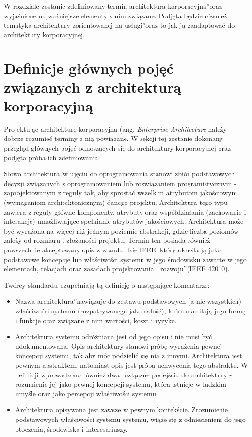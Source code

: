 W rozdziale zostanie zdefiniowany termin \quotedblbase architektura korporacyjna\textquotedblright oraz wyjaśnione najważniejsze elementy z nim związane. Podjęta będzie również tematyka \quotedblbase architektury zorientowanej na usługi\textquotedblright oraz to jak ją zaadaptować do architektury korporacyjnej. 

\section{Definicje głównych pojęć związanych z architekturą korporacyjną}
Projektując architekturę korporacyjną (ang. \textit{Enterprise Architecture} należy dobrze rozumieć terminy z nią powiązane. W sekcji tej zostanie dokonany przegląd głównych pojęć odnoszących się do architektury korporacyjnej oraz podjęta próba ich zdefiniowania.

Słowo \quotedblbase architektura\textquotedblright w ujęciu do oprogramowania stanowi zbiór podstawowych decyzji związanych z oprogramowaniem lub rozwiązaniem programistycznym - zaprojektowanym z reguły tak, aby sprostać wszelkim atrybutom jakościowym (wymaganiom architektonicznym) danego projektu. Architektura tego typu zawiera z reguły główne komponenty, atrybuty oraz współdziałania (zachowanie i interakcje) umożliwiające spełnianie atrybutów jakościowych. Architektura może być wyrażona na więcej niż jednym poziomie abstrakcji, gdzie liczba poziomów zależy od rozmiaru i złożoności projektu. Termin ten posiada również powszechnie akceptowany opis w standardzie IEEE, który określa ją jako \quotedblbase podstawowe koncepcje lub właściwości systemu w jego  środowisku zawarte w jego elementach, relacjach oraz zasadach projektowania i rozwoju\textquotedblright (IEEE 42010). \cite{SOAWzorceArch}

Twórcy standardu uzupełniają tą definicję o następujące komentarze: 
\begin{itemize}
\item{Nazwa \quotedblbase architektura\textquotedblright nawiązuje do zestawu podstawowych (a nie wszystkich) właściwości systemu (rozpatrywanego jako całość), które określają jego formę i funkcje oraz związane z nim wartości, koszt i ryzyko.}
\item{Architektura systemu odróżniana jest od jego opisu i nie musi być udokumentowana. Opis architektury stanowi próbę wyrażenia pewnej koncepcji systemu, tak aby móc podzielić się nią z innymi. Architektura jest pewnym abstraktem, natomiast opis jest próbą uchwycenia tego abstraktu.
W definicji wprowadzono również dwa rozłączne podejścia do architektury - rozumienie jej jako pewnej koncepcji systemu, która istnieje w ludzkim  umyśle oraz jako percepcji właściwości systemu.}
\item{Architektura opisywana jest zawsze w pewnym kontekście. Zrozumienie podstawowych właściwości systemu systemu, wiąże się z odniesieniem do jego otoczenia, środowiska i interesariuszy.}
\end{itemize}

